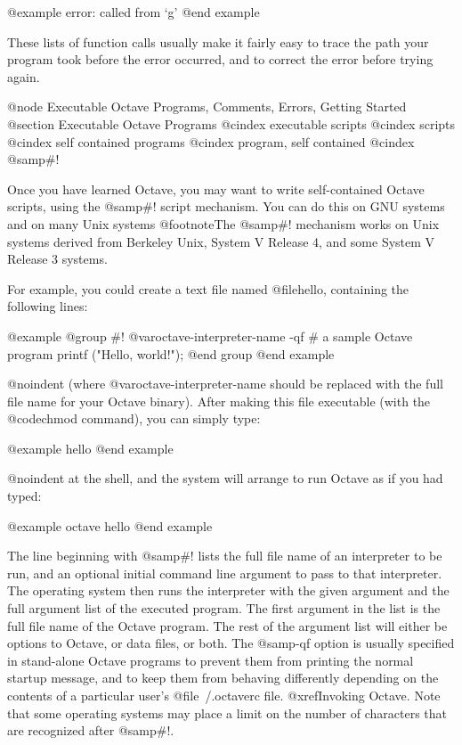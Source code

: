@example
error: called from `g'
@end example

These lists of function calls usually make it fairly easy to trace the
path your program took before the error occurred, and to correct the
error before trying again.

@node Executable Octave Programs, Comments, Errors, Getting Started
@section Executable Octave Programs
@cindex executable scripts
@cindex scripts
@cindex self contained programs
@cindex program, self contained
@cindex @samp{#!}

Once you have learned Octave, you may want to write self-contained
Octave scripts, using the @samp{#!} script mechanism.  You can do this
on GNU systems and on many Unix systems @footnote{The @samp{#!}
mechanism works on Unix systems derived from Berkeley Unix, System V
Release 4, and some System V Release 3 systems.}

For example, you could create a text file named @file{hello}, containing
the following lines:

@example
@group
#! @var{octave-interpreter-name} -qf
# a sample Octave program
printf ("Hello, world!\n");
@end group
@end example

@noindent
(where @var{octave-interpreter-name} should be replaced with the full
file name for your Octave binary).  After making this file executable
(with the @code{chmod} command), you can simply type:

@example
hello
@end example

@noindent
at the shell, and the system will arrange to run Octave as if you had
typed:

@example
octave hello
@end example

The line beginning with @samp{#!} lists the full file name of an
interpreter to be run, and an optional initial command line argument to
pass to that interpreter.  The operating system then runs the
interpreter with the given argument and the full argument list of the
executed program.  The first argument in the list is the full file name
of the Octave program. The rest of the argument list will either be
options to Octave, or data files, or both.  The @samp{-qf} option is
usually specified in stand-alone Octave programs to prevent them from
printing the normal startup message, and to keep them from behaving
differently depending on the contents of a particular user's
@file{~/.octaverc} file.  @xref{Invoking Octave}.  Note that some
operating systems may place a limit on the number of characters that are
recognized after @samp{#!}.

